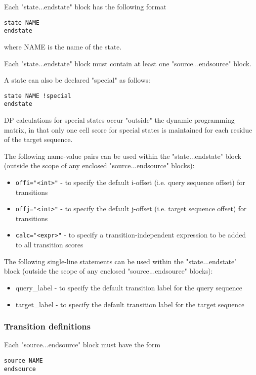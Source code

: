 Each "state...endstate" block has the following format
\begin{verbatim}
state NAME
endstate
\end{verbatim}

where NAME is the name of the state.

Each "state...endstate" block must contain at least one "source...endsource" block.

A state can also be declared "special" as follows:

\begin{verbatim}
state NAME !special
endstate
\end{verbatim}

DP calculations for special states occur "outside" the dynamic programming matrix,
in that only one cell score for special states is maintained for each
residue of the target sequence.

The following name-value pairs can be used within the "state...endstate" block
(outside the scope of any enclosed "source...endsource" blocks):

\begin{itemize}
\item {\tt offi="<int>"}  - to specify the default i-offset (i.e. query sequence offset) for transitions
\item {\tt offj="<int>"}  - to specify the default j-offset (i.e. target sequence offset) for transitions
\item {\tt calc="<expr>"}  - to specify a transition-independent expression to be added to all transition scores
\end{itemize}

The following single-line statements can be used within the "state...endstate" block
(outside the scope of any enclosed "source...endsource" blocks):

\begin{itemize}
\item query\_label  - to specify the default transition label for the query sequence
\item target\_label  - to specify the default transition label for the target sequence
\end{itemize}


\subsubsection{Transition definitions}
Each "source...endsource" block must have the form

\begin{verbatim}
source NAME
endsource
\end{verbatim}

